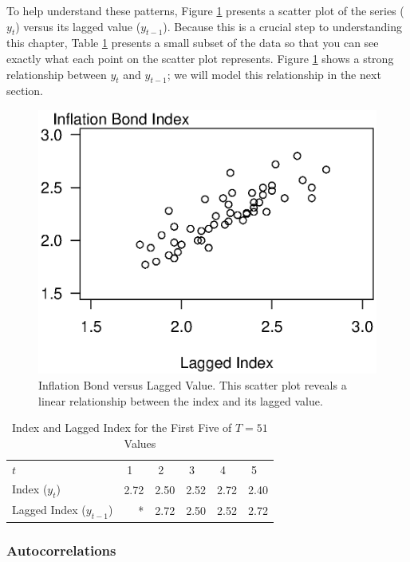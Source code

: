 To help understand these patterns, Figure \ref{F8:InfBondLag}
presents a scatter plot of the series ($y_t$) versus its lagged
value ($y_{t-1}$). Because this is a crucial step to understanding
this chapter, Table \ref{T8:InfBondIndex} presents a small subset of
the data so that you can see exactly what each point on the scatter
plot represents. Figure \ref{F8:InfBondLag} shows a strong
relationship between $y_t$ and $y_{t-1}$; we will model this
relationship in the next section.

\begin{figure}[htp]
  \begin{center}
    \includegraphics[width=.7\textwidth]{Chapter8AutoReg/InfBondLag.eps}
    \caption{\label{F8:InfBondLag} \small Inflation
Bond versus Lagged Value. This scatter plot reveals a linear
relationship between the index and its lagged value.}
  \end{center}
\end{figure}


\begin{table}[h]
\caption{\label{T8:InfBondIndex} Index and Lagged Index for the
First Five of $T=51$ Values}
\begin{center}
\begin{tabular}{l|rrrrr}
\hline
$t$ & 1~~ & 2~~ & 3~~ & 4~~ & 5~~ \\
Index ($y_t$) & 2.72 & 2.50 &  2.52 &  2.72 & 2.40 \\
Lagged Index ($y_{t-1}$) & * &  2.72   &  2.50   &  2.52  & 2.72
\\ \hline
\end{tabular}\end{center}\end{table}


\bigskip

\subsubsection*{Autocorrelations}

